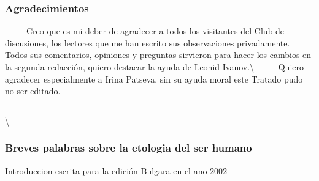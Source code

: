 \subsubsection*{Agradecimientos}\label{agradecimientos}

~ ~ ~ Creo que es mi deber de agradecer a todos los visitantes del Club
de discusiones, los lectores que me han escrito sus observaciones
privadamente. Todos sus comentarios, opiniones y preguntas sirvieron
para hacer los cambios en la segunda redacción, quiero destacar la ayuda
de Leonid Ivanov.\textbackslash{} ~ ~ ~ Quiero agradecer especialmente a
Irina Patseva, sin su ayuda moral este Tratado pudo no ser editado.

\begin{center}\rule{0.5\linewidth}{\linethickness}\end{center}

\textbackslash{} \protect\hypertarget{M02}{}{}

\subsubsection*{Breves palabras sobre la etologia del ser
humano}\label{breves-palabras-sobre-la-etologia-del-ser-humano}

Introduccion escrita para la edición Bulgara en el ano 2002

